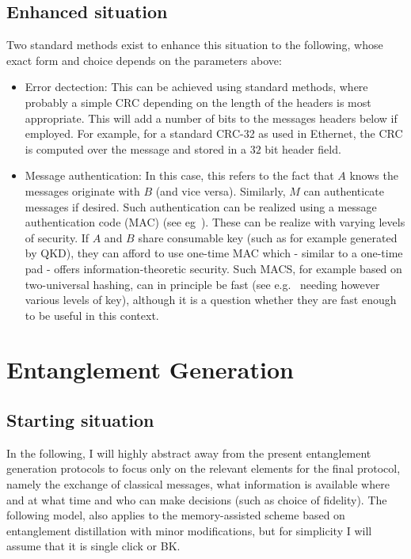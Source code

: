 \documentclass{article}
\begin{document}
\subsection{Enhanced situation}
Two standard methods exist to enhance this situation to the following, whose exact form and choice depends on the parameters above:
\begin{itemize}
\item Error dectection: This can be achieved using standard methods, where probably a simple CRC depending on the length of the headers is most appropriate. This will add a number of bits to the messages headers below if employed. For example, for a standard CRC-32 as used in Ethernet, the CRC is computed over the message and stored in a $32$ bit header field.
\item Message authentication: In this case, this refers to the fact that $A$ knows the messages originate with $B$ (and vice versa). 
Similarly, $M$ can authenticate messages if desired. Such authentication can be realized using a message authentication code (MAC) (see eg~\cite{UMAC}). These can be realize with varying levels of security. If $A$ and $B$ share consumable key (such as for example generated by QKD), they can afford to use one-time MAC which - similar to a one-time pad - offers information-theoretic security. Such MACS, for example based on two-universal hashing,  can in principle be fast (see e.g.~\cite{UMAC} needing however various levels of key), although it is a question whether they are fast enough to be useful in this context.
\end{itemize}

\section{Entanglement Generation}\label{sec:entanglementGeneration}

\subsection{Starting situation}
In the following, I will highly abstract away from the present entanglement generation protocols to focus only on the relevant elements for the final protocol, namely the exchange
of classical messages, what information is available where and at what time and who can make decisions (such as choice of fidelity). 
The following model, also applies to the memory-assisted scheme based on entanglement distillation with minor modifications, but for simplicity I will assume that it is 
single click or BK. 
\end{document}
